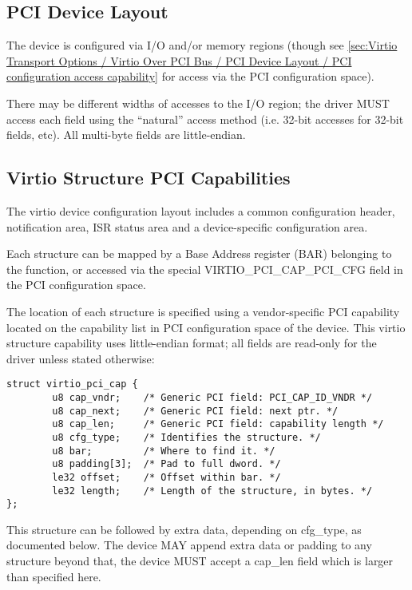 \subsection{PCI Device Layout}\label{sec:Virtio Transport Options / Virtio Over PCI Bus / PCI Device Layout}

The device is configured via I/O and/or memory regions (though see
\ref{sec:Virtio Transport Options / Virtio Over PCI Bus / PCI Device Layout / PCI configuration access capability} for access via the PCI configuration space).

There may be different widths of accesses to the I/O region; the driver
MUST access each field using the “natural” access method (i.e. 32-bit accesses for 32-bit fields, etc).  All multi-byte fields are little-endian.

\subsection{Virtio Structure PCI Capabilities}\label{sec:Virtio Transport Options / Virtio Over PCI Bus / Virtio Structure PCI Capabilities}

The virtio device configuration layout includes a common configuration header, notification area, ISR status area and a device-specific configuration area.

Each structure can be mapped by a Base Address register (BAR) belonging to
the function, or accessed via the special VIRTIO_PCI_CAP_PCI_CFG field in the PCI configuration space.

The location of each structure is specified using a vendor-specific PCI capability located
on the capability list in PCI configuration space of the device.
This virtio structure capability uses little-endian format; all fields are
read-only for the driver unless stated otherwise:

\begin{lstlisting}
struct virtio_pci_cap {
        u8 cap_vndr;    /* Generic PCI field: PCI_CAP_ID_VNDR */
        u8 cap_next;    /* Generic PCI field: next ptr. */
        u8 cap_len;     /* Generic PCI field: capability length */
        u8 cfg_type;    /* Identifies the structure. */
        u8 bar;         /* Where to find it. */
        u8 padding[3];  /* Pad to full dword. */
        le32 offset;    /* Offset within bar. */
        le32 length;    /* Length of the structure, in bytes. */
};
\end{lstlisting}

This structure can be followed by extra data, depending on
cfg_type, as documented below.  The device MAY append extra data
or padding to any structure beyond that, the device MUST accept a cap_len field
which is larger than specified here.

